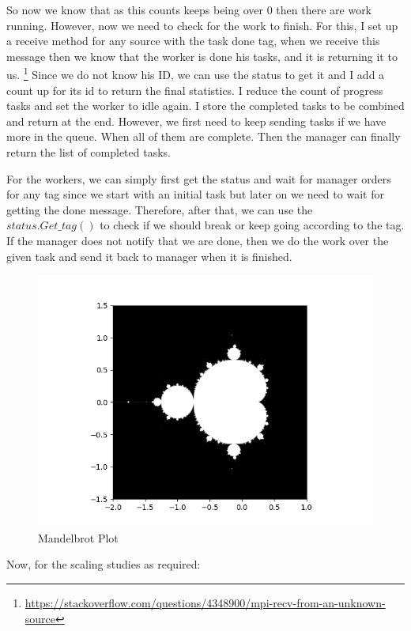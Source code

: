 \documentclass[unicode,11pt,a4paper,oneside,numbers=endperiod,openany]{scrartcl}
\begin{document}
So now we know that as this counts keeps being over 0 then there are work running. However, now we need to check for the work to finish. 
For this, I set up a receive method for any source with the task done tag, when we receive this message then we know that the worker is done 
his tasks, and it is returning it to us. \footnote{\url{https://stackoverflow.com/questions/4348900/mpi-recv-from-an-unknown-source}}
Since we do not know his ID, we can use the status to get it and I add a count up for its id to return the final statistics. I reduce the count of progress tasks 
and set the worker to idle again. I store the completed tasks to be combined and return at the end. However, we first need to keep sending tasks if we have 
more in the queue. When all of them are complete. Then the manager can finally return the list of completed tasks. 

For the workers, we can simply first get the status and wait for manager orders for any tag since we start with an initial task but later 
on we need to wait for getting the done message. Therefore, after that, we can use the $status.Get\_tag()$ to check if we should break or keep going 
according to the tag. If the manager does not notify that we are done, then we do the work over the given task and send it back to manager when it is finished. 

\begin{figure}[H]
  \centering
  \includegraphics[width=\textwidth]{../code/hpc_python/mandelbrot.png}
  \caption{Mandelbrot Plot}
\end{figure}

Now, for the scaling studies as required: 
\end{document}

